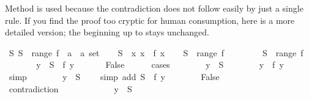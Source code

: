 \begin{isabellebody}
\begin{isamarkuptext}
Method  is used because the contradiction does not follow easily
by just a single rule. If you find the proof too cryptic for human
consumption, here is a more detailed version; the beginning up to
 stays unchanged.%
\end{isamarkuptext}%
\isamarkuptrue%
\isamarkupfalse%
\ {\isachardoublequoteopen}{\isasymexists}S{\isachardot}\ S\ {\isasymnotin}\ range\ {\isacharparenleft}f\ {\isacharcolon}{\isacharcolon}\ {\isacharprime}a\ {\isasymRightarrow}\ {\isacharprime}a\ set{\isacharparenright}{\isachardoublequoteclose}\isanewline
%
\isadelimproof
%
\endisadelimproof
%
\isatagproof
{}\isamarkupfalse%
\isanewline
\ \ \isamarkupfalse%
\ {\isacharquery}S\ {\isacharequal}\ {\isachardoublequoteopen}{\isacharbraceleft}x{\isachardot}\ x\ {\isasymnotin}\ f\ x{\isacharbraceright}{\isachardoublequoteclose}\isanewline
\ \ \isamarkupfalse%
\ {\isachardoublequoteopen}{\isacharquery}S\ {\isasymnotin}\ range\ f{\isachardoublequoteclose}\isanewline
\ \ \isamarkupfalse%
\isanewline
\ \ \ \ \isamarkupfalse%
\ {\isachardoublequoteopen}{\isacharquery}S\ {\isasymin}\ range\ f{\isachardoublequoteclose}\isanewline
\ \ \ \ \isamarkupfalse%
\ \isamarkupfalse%
\ y\ \ {\isachardoublequoteopen}{\isacharquery}S\ {\isacharequal}\ f\ y{\isachardoublequoteclose}\ \isacommand{{\isachardot}{\isachardot}}\isamarkupfalse%
\isanewline
\ \ \ \ \isamarkupfalse%
\ False\isanewline
\ \ \ \ \isamarkupfalse%
\ cases\isanewline
\ \ \ \ \ \ \isamarkupfalse%
\ {\isachardoublequoteopen}y\ {\isasymin}\ {\isacharquery}S{\isachardoublequoteclose}\isanewline
\ \ \ \ \ \ \isamarkupfalse%
\ {\isachardoublequoteopen}y\ {\isasymnotin}\ f\ y{\isachardoublequoteclose}\ \ \ \isamarkupfalse%
\ simp\isanewline
\ \ \ \ \ \ \isamarkupfalse%
\ {\isachardoublequoteopen}y\ {\isasymnotin}\ {\isacharquery}S{\isachardoublequoteclose}\ \ \ \ \isamarkupfalse%
{\isacharparenleft}simp\ add{\isacharcolon}\ {\isacharbackquoteopen}{\isacharquery}S\ {\isacharequal}\ f\ y{\isacharbackquoteclose}{\isacharparenright}\isanewline
\ \ \ \ \ \ \isamarkupfalse%
\ False\ \ \ \ \ \ \ \ \ \isamarkupfalse%
\ contradiction\isanewline
\ \ \ \ \isamarkupfalse%
\isanewline
\ \ \ \ \ \ \isamarkupfalse%
\ {\isachardoublequoteopen}y\ {\isasymnotin}\ {\isacharquery}S{\isachardoublequoteclose}\isanewline

\end{isabellebody}
